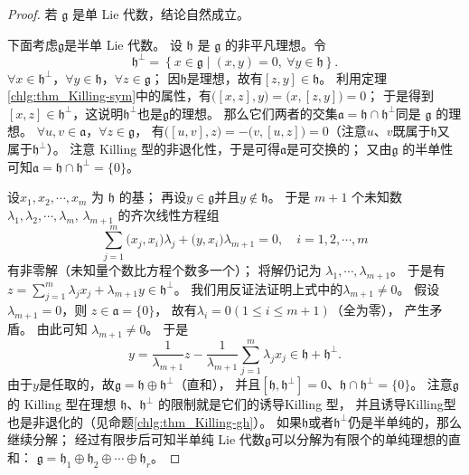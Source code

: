 \begin{proof}
    若 $\mathfrak{g}$ 是单 Lie 代数，结论自然成立。
    
    下面考虑$\mathfrak{g}$是半单 Lie 代数。
    设 $\mathfrak{h}$ 是 $\mathfrak{g}$ 的非平凡理想。令
    \begin{equation}\label{chlg:eqn_h-perp}
        \mathfrak{h}^{\perp}=\left\{x \in \mathfrak{g} \mid (x, y)=0,\ \forall y \in \mathfrak{h}\right\} .
    \end{equation}
    $\forall x \in \mathfrak{h}^{\perp}$，$\forall y \in \mathfrak{h}$，$\forall z \in \mathfrak{g}$；
    因$\mathfrak{h}$是理想，故有$[z, y]\in \mathfrak{h}$。
    利用定理\ref{chlg:thm_Killing-sym}中的属性，有$\bigl([x, z], y\bigr)=\bigl(x,[z, y]\bigr)=0$；
    于是得到$[x, z]\in \mathfrak{h}^\perp$，这说明$\mathfrak{h}^\perp$也是$\mathfrak{g}$的理想。
    那么它们两者的交集$\mathfrak{a}=\mathfrak{h} \cap \mathfrak{h}^{\perp}$同是 $\mathfrak{g}$ 的理想。
    $\forall u, v \in \mathfrak{a}$，$\forall z \in \mathfrak{g}$，
    有$\bigl([u, v], z\bigr)=-\bigl(v,[u, z]\bigr)=0$（注意$u$、$v$既属于$\mathfrak{h}$又
    属于$\mathfrak{h}^{\perp}$）。
    注意 Killing 型的非退化性，于是可得$\mathfrak{a}$是可交换的；
    又由$\mathfrak{g}$ 的半单性可知$\mathfrak{a}=\mathfrak{h} \cap \mathfrak{h}^{\perp}=\{0\}$。
    
    
    设$x_1, x_2, \cdots, x_m$ 为 $\mathfrak{h}$ 的基；
    再设$y \in \mathfrak{g}$并且$ y \notin \mathfrak{h}$。
    于是 $m+1$ 个未知数 $\lambda_1, \lambda_2, \cdots, \lambda_m$, $\lambda_{m+1}$ 的齐次线性方程组
    \begin{equation}
        \sum_{j=1}^m \bigl(x_j, x_i\bigr) \lambda_j+ \bigl(y, x_i\bigr) \lambda_{m+1}=0, \quad i=1,2, \cdots, m
    \end{equation}
    有{\kaishu 非零解}（未知量个数比方程个数多一个）；
    将解仍记为 $\lambda_1, \cdots,  \lambda_{m+1}$。
    于是有$z=\sum_{j=1}^m \lambda_j x_j+\lambda_{m+1} y \in \mathfrak{h}^{\perp} $。
    我们用反证法证明上式中的$\lambda_{m+1} \neq 0$。
    假设$\lambda_{m+1}=0$，则 $z \in \mathfrak{a}=\{0\}$，
    故有$\lambda_i=0 (1 \leqslant i \leqslant m+1)$（全为零）， 产生矛盾。
    由此可知 $\lambda_{m+1} \neq 0$。 于是
    \begin{equation}
        y=\frac{1}{\lambda_{m+1}} z-\frac{1}{\lambda_{m+1}} \sum_{j=1}^m \lambda_j x_j \in \mathfrak{h}+\mathfrak{h}^{\perp} .
    \end{equation}
    由于$y$是任取的，故$\mathfrak{g}=\mathfrak{h} \oplus \mathfrak{h}^{\perp}$（直和），
    并且$[\mathfrak{h} , \mathfrak{h}^{\perp}]=0$、$\mathfrak{h} \cap \mathfrak{h}^{\perp}=\{0\}$。
    注意$\mathfrak{g}$ 的 Killing 型在理想 $\mathfrak{h}$、$ \mathfrak{h}^{\perp}$ 的限制就是它们的诱导Killing 型，
    并且诱导Killing型也是非退化的（见命题\ref{chlg:thm_Killing-gh}）。 %
    如果$\mathfrak{h}$或者$ \mathfrak{h}^{\perp}$仍是半单纯的，那么继续分解；
    经过有限步后可知半单纯 Lie 代数$\mathfrak{g}$可以分解为有限个的单纯理想的直和：
    $\mathfrak{g}=\mathfrak{h}_1 \oplus \mathfrak{h}_2 \oplus \cdots \oplus \mathfrak{h}_r$。
    

\end{proof}
